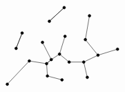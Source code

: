 \[
\begin{tikzpicture}[x=0.01cm,y=0.01cm]
  \draw (298,365) -- (244,315);
  \draw (390,335) -- (375,248);
  \draw (375,248) -- (421,191);
  \draw (301,260) -- (281,195);
  \draw (281,195) -- (251,175);
  \draw (219,238) -- (251,175);
  \draw (244,315) -- (298,365);
  \draw (145,272) -- (123,216);
  \draw (171,170) -- (234,160);
  \draw (237,115) -- (234,160);
  \draw (369,166) -- (316,166);
  \draw (316,166) -- (281,195);
  \draw (382,110) -- (369,166);
  \draw (492,213) -- (421,191);
  \draw (421,191) -- (369,166);
  \draw (123,216) -- (145,272);
  \draw (91,85) -- (171,170);
  \draw (290,101) -- (237,115);
  \draw (234,160) -- (251,175);
  \draw (251,175) -- (234,160);
  \draw[black,fill=black] (298,365) circle (5);
  \draw[black,fill=black] (390,335) circle (5);
  \draw[black,fill=black] (375,248) circle (5);
  \draw[black,fill=black] (301,260) circle (5);
  \draw[black,fill=black] (281,195) circle (5);
  \draw[black,fill=black] (219,238) circle (5);
  \draw[black,fill=black] (244,315) circle (5);
  \draw[black,fill=black] (145,272) circle (5);
  \draw[black,fill=black] (171,170) circle (5);
  \draw[black,fill=black] (237,115) circle (5);
  \draw[black,fill=black] (369,166) circle (5);
  \draw[black,fill=black] (316,166) circle (5);
  \draw[black,fill=black] (382,110) circle (5);
  \draw[black,fill=black] (492,213) circle (5);
  \draw[black,fill=black] (421,191) circle (5);
  \draw[black,fill=black] (123,216) circle (5);
  \draw[black,fill=black] (91,85) circle (5);
  \draw[black,fill=black] (290,101) circle (5);
  \draw[black,fill=black] (234,160) circle (5);
  \draw[black,fill=black] (251,175) circle (5);
\end{tikzpicture}
\]

